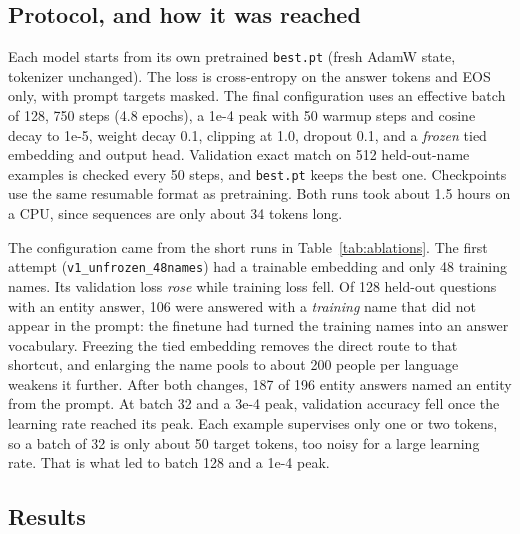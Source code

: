 \documentclass[10pt,a4paper]{article}
\newcommand{\code}[1]{\texttt{#1}}
\newcommand{\tablefile}[1]{}
\begin{document}
\subsection{Protocol, and how it was reached}
Each model starts from its own pretrained \code{best.pt} (fresh AdamW state, tokenizer unchanged). The loss is cross-entropy on the answer tokens and EOS only, with prompt targets masked.
The final configuration uses an effective batch of 128, 750 steps (4.8 epochs), a 1e-4 peak with 50 warmup steps and cosine decay to 1e-5, weight decay 0.1, clipping at 1.0, dropout 0.1, and a \emph{frozen} tied embedding and output head.
Validation exact match on 512 held-out-name examples is checked every 50 steps, and \code{best.pt} keeps the best one.
Checkpoints use the same resumable format as pretraining. Both runs took about 1.5 hours on a CPU, since sequences are only about 34 tokens long.

The configuration came from the short runs in Table~\ref{tab:ablations}.
The first attempt (\code{v1\_unfrozen\_48names}) had a trainable embedding and only 48 training names.
Its validation loss \emph{rose} while training loss fell. Of 128 held-out questions with an entity answer, 106 were answered with a \emph{training} name that did not appear in the prompt: the finetune had turned the training names into an answer vocabulary.
Freezing the tied embedding removes the direct route to that shortcut, and enlarging the name pools to about 200 people per language weakens it further. After both changes, 187 of 196 entity answers named an entity from the prompt.
At batch 32 and a 3e-4 peak, validation accuracy fell once the learning rate reached its peak. Each example supervises only one or two tokens, so a batch of 32 is only about 50 target tokens, too noisy for a large learning rate. That is what led to batch 128 and a 1e-4 peak.

\begin{table}[t]
\centering\footnotesize
\tablefile{ablations}
\caption{Finetuning runs (validation exact match on held-out names). All start from the same pretrained checkpoint. Runs with \code{48names} used the first, smaller lexicon.}
\label{tab:ablations}
\end{table}

\subsection{Results}
\begin{table}[t]
\centering\small
\tablefile{reasoning_results}
\caption{Accuracy (\%) before and after finetuning. \emph{Exact}: greedy decoding to EOS equals the answer. \emph{Choice}: the candidate with the highest summed log-probability. \emph{Chance}: the mean of $1/|\text{candidates}|$. The pretrained model's exact match is 0.0 everywhere, so only its choice accuracy is shown.}
\label{tab:rresults}
\end{table}
\end{document}
